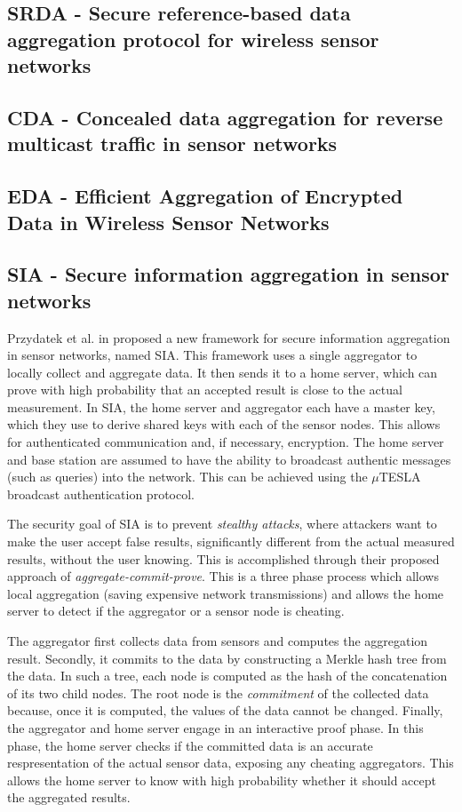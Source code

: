 \documentclass[a4paper]{article}
\begin{document}
\subsection{SRDA - Secure reference-based data aggregation protocol for wireless sensor networks}

\subsection{CDA - Concealed data aggregation for reverse multicast traffic in sensor networks}

\subsection{EDA - Efficient Aggregation of Encrypted Data in Wireless Sensor Networks}

\subsection{SIA - Secure information aggregation in sensor networks}

Przydatek et al. in \cite{SIA} proposed a new framework for secure information
aggregation in sensor networks, named SIA. This framework uses a single
aggregator to locally collect and aggregate data. It then sends it to a home
server, which can prove with high probability that an accepted result is close
to the actual measurement. In SIA, the home server and aggregator each have a
master key, which they use to derive shared keys with each of the sensor
nodes. This allows for authenticated communication and, if necessary,
encryption. The home server and base station are assumed to have the ability
to broadcast authentic messages (such as queries) into the network. This can
be achieved using the $\mu$TESLA broadcast authentication protocol.

The security goal of SIA is to prevent {\em stealthy attacks}, where attackers
want to make the user accept false results, significantly different from the
actual measured results, without the user knowing. This is accomplished
through their proposed approach of {\em aggregate-commit-prove}. This is a
three phase process which allows local aggregation (saving expensive network
transmissions) and allows the home server to detect if the aggregator or a
sensor node is cheating.

The aggregator first collects data from sensors and computes the aggregation
result. Secondly, it commits to the data by constructing a Merkle hash tree
from the data. In such a tree, each node is computed as the hash of the
concatenation of its two child nodes. The root node is the {\em commitment} of
the collected data because, once it is computed, the values of the data cannot
be changed. Finally, the aggregator and home server engage in an interactive
proof phase. In this phase, the home server checks if the committed data is an
accurate respresentation of the actual sensor data, exposing any cheating
aggregators. This allows the home server to know with high probability whether
it should accept the aggregated results.
\end{document}
